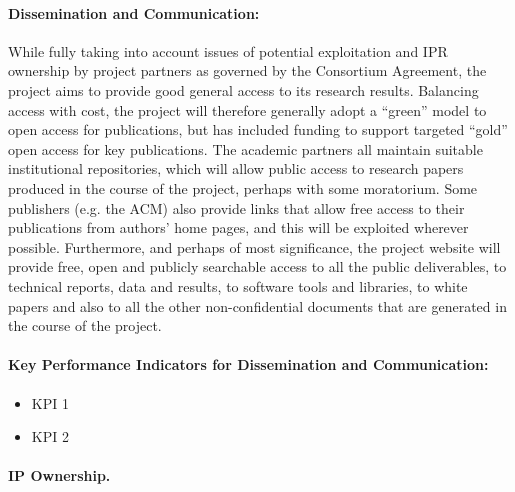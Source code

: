 \documentclass[a4paper,11pt]{article}
\begin{document}
\paragraph{Dissemination and Communication:}
While fully taking into account issues of potential exploitation and IPR ownership by project partners
as governed by the Consortium Agreement,
the project aims to provide good general access to its research results.
Balancing access with cost, the project will therefore generally adopt a ``green'' model to open access for publications,
but has included funding to support targeted ``gold'' open access for key publications.
The academic partners all maintain suitable institutional repositories, which will allow public access to research papers produced in the
course of the project, perhaps with some moratorium.  Some publishers (e.g. the ACM) also provide links that allow
free access to their publications from authors' home pages, and this will be exploited wherever possible.
%
Furthermore, and perhaps of most significance, the project website will provide free,
open and publicly searchable access to all the public deliverables, to technical reports, data and results, to software tools
and libraries, to white papers and also to all
the other non-confidential documents that are generated in the course of the project.  

\begin{mdframed}[backgroundcolor=blue!5]
\paragraph{Key Performance Indicators for Dissemination and Communication:}
\begin{itemize}
\item KPI 1
\item KPI 2
\end{itemize}
\end{mdframed}




\paragraph{IP Ownership.}
\end{document}
